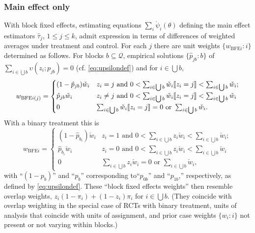 \documentclass{article}
\DeclarePairedDelimiter{\indicator}{\llbracket}{\rrbracket}
\newcommand{\owt}[1][{[z_{i}]}]{\ensuremath{\check{w}_{i#1}}}
\newcommand{\absorbInterceptsEF}{\upsilon}
\begin{document}
\subsubsection{Main effect only}
With block fixed effects, estimating equations $\sum_{i}\acute{\psi}_{i}(\theta)$ defining
the main effect estimators $\hat{\tau}_{j}$,
$1\leq j \leq k$,  admit expression in terms of differences of weighted averages
under treatment and control.  For each $j$ there are unit weights $\{w_{\text{BFE}i}:
i\}$ determined as follows. For blocks $b \subseteq \mathcal{Q}$,
empirical solutions $\{\hat{p}_{jb}:b\}$  of $\sum_{i \in \bigcup b}
\absorbInterceptsEF (z_{i}; p_{jb})=0$ (cf. \eqref{eq:upsilondef}) and
for $i \in \bigcup b$,
\begin{equation} \label{eq:28}
w_{\text{BFE}i(j)} = 
  \begin{cases}
(1-\hat{p}_{jb})\owt[]& z_i=j \text{ and } 0 < \sum_{i \in \bigcup b} \owt[] \indicator{z_i=j} < \sum_{i \in \bigcup b} \owt[];\\ 
\hat{p}_{jb} \owt[] & z_i\neq j \text{ and }0 < \sum_{i
  \in \bigcup b} \owt[] \indicator{z_i=j} < \sum_{i \in \bigcup b} \owt[]\\
0 &  \sum_{i \in \bigcup b} \owt[] \indicator{z_i=j} = 0 \text{ or }
  \sum_{i \in \bigcup b} \owt[].
\end{cases}
\end{equation}
With a binary treatment this is
\begin{equation*}
w_{\text{BFE}i} = 
  \begin{cases}
(1-\hat{p}_{b_{i}})\owt[]& z_i=1 \text{ and } 0 < \sum_{i \in \bigcup b} z_i\owt[] < \sum_{i \in \bigcup b} \owt[];\\ 
\hat{p}_{b_{i}} \owt[] & z_i=0 \text{ and }0 < \sum_{i
  \in \bigcup b} z_i\owt[] < \sum_{i \in \bigcup b} \owt[]\\
0 &  \sum_{i \in \bigcup b} z_i\owt[]  = 0 \text{ or }
  \sum_{i \in \bigcup b} \owt[],
\end{cases}
\end{equation*}
with ``$(1-p_{b})$'' and ``$p_{b}$'' corresponding to``$p_{0b}$''
and ``$p_{1b}$,'' respectively, as defined by \eqref{eq:upsilondef}.
These ``block fixed effects weights'' then resemble overlap weights,
$z_{i}(1-\pi_{i}) + (1-z_{i})\pi_{i}$ for $i\in \bigcup b$. (They coincide with
overlap weighting in the special case of RCTs with binary treatment,
units of analysis that coincide with units of assignment,
and prior case weights $\{w_{i}:i\}$ not present or not varying within blocks.)
\end{document}
